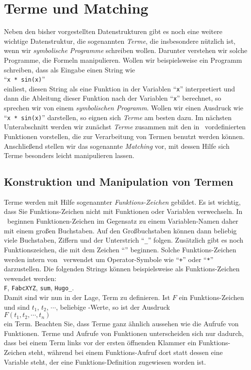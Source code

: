 \section{Terme und Matching}
Neben den bisher vorgestellten Datenstrukturen gibt es noch eine weitere wichtige
Datenstruktur, die sogenannten \emph{Terme}, die insbesondere nützlich ist, wenn wir
\emph{symbolische Programme} 
schreiben wollen.  Darunter verstehen wir solche Programme, die Formeln manipulieren.
Wollen wir beispielsweise ein Programm schreiben, dass als Eingabe einen String wie
\\[0.2cm]
\hspace*{1.3cm}
``\texttt{x * sin(x)}''
\\[0.2cm]
einliest, diesen String als eine Funktion in der Variablen ``\texttt{x}'' interpretiert
und dann die Ableitung dieser Funktion nach der Variablen ``\texttt{x}'' berechnet, so
sprechen wir von einem \emph{symbolischen Programm}.   Wollen wir einen Ausdruck wie 
``\texttt{x * sin(x)}'' darstellen, so eignen sich \emph{Terme} am besten dazu.
Im nächsten Unterabschnitt werden wir zunächst \emph{Terme} zusammen mit den in \setl\
vordefinierten Funktionen vorstellen, die zur Verarbeitung von Termen benutzt werden können.
Anschließend stellen wir das sogenannte \emph{Matching} vor, mit dessen Hilfe sich Terme
besonders leicht manipulieren lassen.


\subsection{Konstruktion und Manipulation von Termen}
Terme werden mit Hilfe sogenannter \emph{Funktions-Zeichen} gebildet.  Es ist wichtig,
dass Sie Funktions-Zeichen nicht mit Funktionen oder Variablen verwechseln.  In \setl\
beginnen Funktionen-Zeichen im Gegensatz zu einem Variablen-Namen daher mit einem großen
Buchstaben.  Auf den Großbuchstaben können  dann beliebig viele Buchstaben, Ziffern und
der Unterstrich ``\texttt{\_}'' folgen.
Zusätzlich gibt es noch Funktionszeichen, die mit dem Zeichen
``\texttt{\symbol{94}}''
beginnen.  Solche Funktions-Zeichen werden intern von \setl\ verwendet um Operator-Symbole
wie ``\texttt{+}'' oder ``\texttt{*}'' darzustellen.
Die folgenden Strings können beispielsweise  als Funktions-Zeichen vewendet werden:
\\[0.2cm]
\hspace*{1.3cm}
\texttt{F}, \quad \texttt{FabcXYZ}, \quad \texttt{sum}, \quad \texttt{Hugo\_}.
\\[0.2cm]
Damit sind wir nun in der Lage, Term zu definieren.  Ist $F$ ein Funktions-Zeichen und sind
$t_1$, $t_2$, $\cdots$, beliebige \setl-Werte, so ist der Ausdruck
\\[0.2cm]
\hspace*{1.3cm}
$F(t_1, t_2, \cdots, t_n)$
\\[0.2cm]
ein Term.  Beachten Sie, dass Terme ganz ähnlich aussehen wie die Aufrufe von Funktionen.
Terme und Aufrufe von Funktionen unterscheiden sich nur dadurch, dass bei einem Term links
vor der ersten öffnenden Klammer ein Funktions-Zeichen steht, während bei einem
Funktions-Aufruf dort statt dessen eine Variable steht, der eine Funktions-Definition zugewiesen
worden ist.

